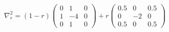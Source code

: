 \documentclass[12pt]{standalone}
\begin{document}
\begin{equation}
\nabla^2_{r}=(1-r)
\begin{pmatrix}
  0 & 1 & 0 \\
  1 & -4 & 0 \\
  0 & 1 & 0
\end{pmatrix}
+r
\begin{pmatrix}
  0.5 & 0 & 0.5 \\
  0 & -2 & 0 \\
  0.5 & 0 & 0.5
\end{pmatrix}
\end{equation}
\end{document}
